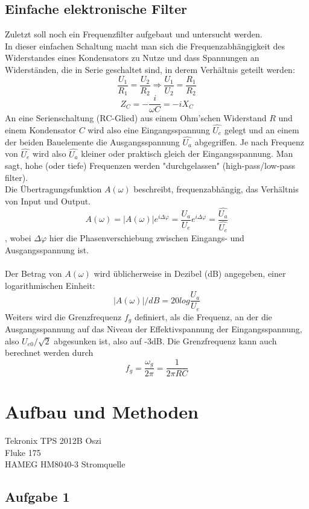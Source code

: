 \documentclass[12pt,a4paper]{article}
\begin{document}
\begin{multicols}{2}
\subsection{Einfache elektronische Filter}
Zuletzt soll noch ein Frequenzfilter aufgebaut und untersucht werden.\\
In dieser einfachen Schaltung macht man sich die Frequenzabhängigkeit des Widerstandes eines Kondensators zu Nutze und dass Spannungen an Widerständen, die in Serie geschaltet sind, in derem Verhältnis geteilt werden:
$$\frac{U_1}{R_1}=\frac{U_2}{R_2} \Rightarrow \frac{U_1}{U_2}=\frac{R_1}{R_2} $$
$$Z_C=-\frac{i}{\omega C}=-i X_C$$
An eine Serienschaltung (RC-Glied) aus einem Ohm'schen Widerstand $R$ und einem Kondensator $C$ wird also eine Eingangsspannung $\hat{U_e}$ gelegt und an einem der beiden Bauelemente die Ausgangsspannung $\hat{U_a}$ abgegriffen. Je nach Frequenz von $\hat{U_e}$ wird also $\hat{U_a}$ kleiner oder praktisch gleich der Eingangsspannung. Man sagt, hohe (oder tiefe) Frequenzen werden "durchgelassen" (high-pass/low-pass filter).\\
Die Übertragungsfunktion $A(\omega)$ beschreibt, frequenzabhängig, das Verhältnis von Input und Output.
$$A(\omega)=|A(\omega)|e^{i\Delta \varphi}=\frac{U_a}{U_e}e^{i\Delta \varphi}=\frac{\hat{U_a}}{\hat{U_e}}$$
, wobei $\Delta \varphi$ hier die Phasenverschiebung zwischen Eingangs- und Ausgangsspannung ist.\\
\\
Der Betrag von $A(\omega)$ wird üblicherweise in Dezibel (dB) angegeben, einer logarithmischen Einheit:
$$|A(\omega)| / dB = 20 log{\frac{U_a}{U_e}}$$
Weiters wird die Grenzfrequenz $f_g$ definiert, als die Frequenz, an der die Ausgangsspannung auf das Niveau der Effektivspannung der Eingangsspannung, also $U_{e0}/\sqrt{2}$ abgesunken ist, also auf -3dB. Die Grenzfrequenz kann auch berechnet werden durch
$$f_g=\frac{\omega_g}{2 \pi}= \frac{1}{2 \pi RC}$$

\section{Aufbau und Methoden}

Tekronix TPS 2012B Oszi\\
Fluke 175\\
HAMEG HM8040-3 Stromquelle\\



\subsection{Aufgabe 1}

\end{multicols}
\end{document}

